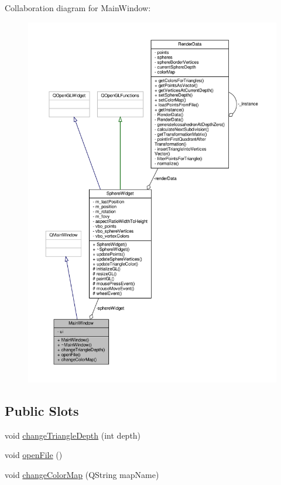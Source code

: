 Collaboration diagram for Main\+Window\+:\nopagebreak
\begin{figure}[H]
\begin{center}
\leavevmode
\includegraphics[width=350pt]{d0/db8/class_main_window__coll__graph}
\end{center}
\end{figure}
\subsection*{Public Slots}
\begin{DoxyCompactItemize}
\item 
void \hyperlink{class_main_window_a7bdf36376a7474c5218923ed66baa937}{change\+Triangle\+Depth} (int depth)
\item 
void \hyperlink{class_main_window_a288b768c3c21a9171bdc56fe845ece8b}{open\+File} ()
\item 
void \hyperlink{class_main_window_a1cfcf14a3dbba8db45a2444a0fbe5a9f}{change\+Color\+Map} (Q\+String map\+Name)
\end{DoxyCompactItemize}
